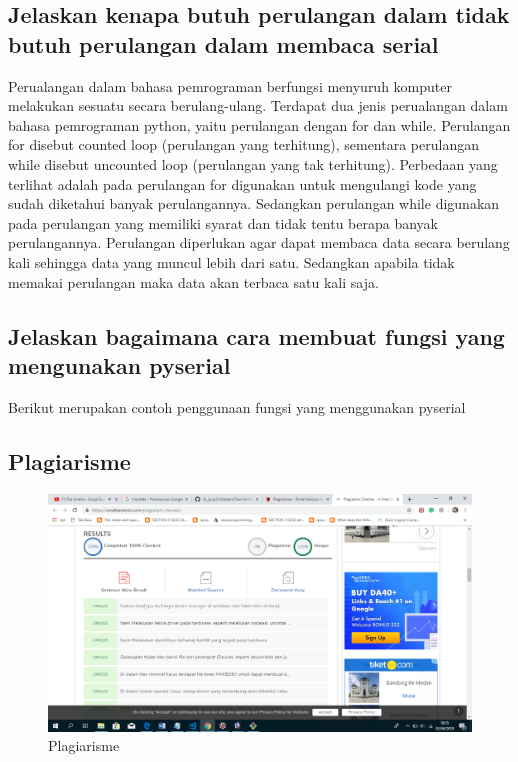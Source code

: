\subsection{Jelaskan kenapa butuh perulangan dalam tidak butuh perulangan dalam membaca serial}
Perualangan dalam bahasa pemrograman berfungsi menyuruh komputer melakukan sesuatu secara berulang-ulang. Terdapat dua jenis perualangan dalam bahasa pemrograman python, yaitu perulangan dengan for dan while.
Perulangan for disebut counted loop (perulangan yang terhitung), sementara perulangan while disebut uncounted loop (perulangan yang tak terhitung). Perbedaan yang terlihat adalah pada perulangan for digunakan untuk mengulangi kode yang sudah diketahui banyak perulangannya. Sedangkan perulangan while digunakan pada perulangan yang memiliki syarat dan tidak tentu berapa banyak perulangannya.
Perulangan diperlukan agar dapat membaca data secara berulang kali sehingga data yang muncul lebih dari satu.  Sedangkan apabila tidak memakai perulangan maka data akan terbaca satu kali saja.

\subsection{Jelaskan bagaimana cara membuat fungsi yang mengunakan pyserial}
Berikut merupakan contoh penggunaan fungsi yang menggunakan pyserial



\subsection{Plagiarisme}
\begin{figure}[h]
\centering
\includegraphics[scale=0.2]{figures/5/Teori/1174096/plagiat.png}
\caption{Plagiarisme}
\label{fig:plagiat}
\end{figure}

